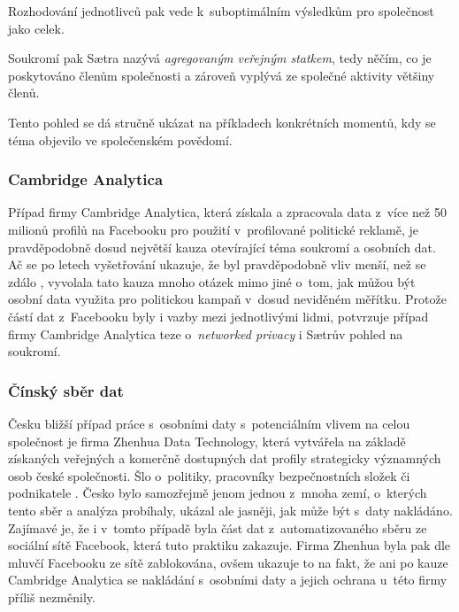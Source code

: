 \begin{displayquote}
	\citep{privacy-as-aggregate-public-good}
\end{displayquote}

Rozhodování jednotlivců pak vede k~suboptimálním výsledkům pro společnost jako celek.

Soukromí pak Sætra nazývá \textit{agregovaným veřejným statkem}, tedy něčím, co je poskytováno členům společnosti a zároveň vyplývá ze společné aktivity většiny členů.

Tento pohled se dá stručně ukázat na příkladech konkrétních momentů, kdy se téma objevilo ve společenském povědomí.

\subsubsection*{Cambridge Analytica}
Případ firmy Cambridge Analytica, která získala a zpracovala data z~více než 50 milionů profilů na Facebooku \citep{cambridge-analytica} pro použití v~profilované politické reklamě, je pravděpodobně dosud největší kauza otevírající téma soukromí a osobních dat. Ač se po letech vyšetřování ukazuje, že byl pravděpodobně vliv menší, než se zdálo \citep{ca-brexit, ca-elections}, vyvolala tato kauza mnoho otázek mimo jiné o~tom, jak můžou být osobní data využita pro politickou kampaň v~dosud neviděném měřítku. Protože částí dat z~Facebooku byly i vazby mezi jednotlivými lidmi, potvrzuje případ firmy Cambridge Analytica teze o~\textit{networked privacy} i Sætrův pohled na soukromí.

\subsubsection*{Čínský sběr dat}
Česku bližší případ práce s~osobními daty s~potenciálním vlivem na celou společnost je firma Zhenhua Data Technology, která vytvářela na základě získaných veřejných a komerčně dostupných dat profily strategicky významných osob české společnosti. Šlo o~politiky, pracovníky bezpečnostních složek či podnikatele \citep{china-czech}. Česko bylo samozřejmě jenom jednou z~mnoha zemí, o~kterých tento sběr a analýza probíhaly, ukázal ale jasněji, jak může být s~daty nakládáno.
Zajímavé je, že i v~tomto případě byla část dat z~automatizovaného sběru ze sociální sítě Facebook, která tuto praktiku zakazuje. Firma Zhenhua byla pak dle mluvčí Facebooku ze sítě zablokována, ovšem ukazuje to na fakt, že ani po kauze Cambridge Analytica se nakládání s~osobními daty a jejich ochrana u~této firmy příliš nezměnily.

